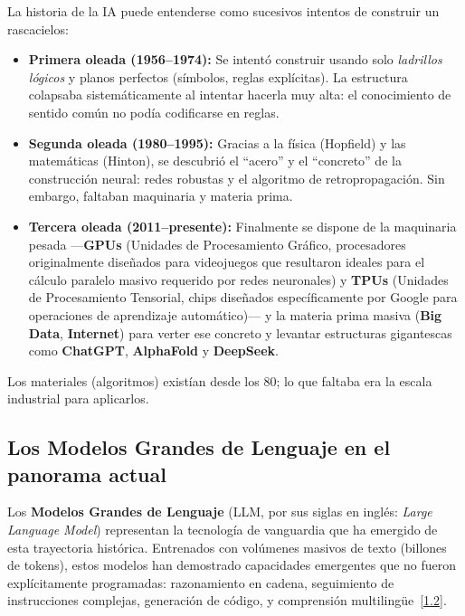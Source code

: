 \documentclass[12pt,a4paper]{report}
\numberwithin{figure}{section}
\begin{document}
\begin{tcolorbox}[colback=blue!5!white, colframe=blue!75!black, title=\textbf{Analogía del Rascacielos}]
La historia de la IA puede entenderse como sucesivos intentos de construir un rascacielos:

\begin{itemize}
    \item \textbf{Primera oleada (1956--1974):} Se intentó construir usando solo \textit{ladrillos lógicos} y planos perfectos (símbolos, reglas explícitas). La estructura colapsaba sistemáticamente al intentar hacerla muy alta: el conocimiento de sentido común no podía codificarse en reglas.
    
    \item \textbf{Segunda oleada (1980--1995):} Gracias a la física (Hopfield) y las matemáticas (Hinton), se descubrió el ``acero'' y el ``concreto'' de la construcción neural: redes robustas y el algoritmo de retropropagación. Sin embargo, faltaban maquinaria y materia prima.
    
    \item \textbf{Tercera oleada (2011--presente):} Finalmente se dispone de la maquinaria pesada ---\textbf{GPUs} (Unidades de Procesamiento Gráfico, procesadores originalmente diseñados para videojuegos que resultaron ideales para el cálculo paralelo masivo requerido por redes neuronales) y \textbf{TPUs} (Unidades de Procesamiento Tensorial, chips diseñados específicamente por Google para operaciones de aprendizaje automático)--- y la materia prima masiva (\textbf{Big Data}, \textbf{Internet}) para verter ese concreto y levantar estructuras gigantescas como \textbf{ChatGPT}, \textbf{AlphaFold} y \textbf{DeepSeek}.
\end{itemize}

Los materiales (algoritmos) existían desde los 80; lo que faltaba era la escala industrial para aplicarlos.
\end{tcolorbox}

\subsection[Los LLM en el panorama actual]{Los Modelos Grandes de Lenguaje en el panorama actual}
\label{subsec:llm_panorama}

Los \textbf{Modelos Grandes de Lenguaje} (LLM, por sus siglas en inglés: \textit{Large Language Model}) representan la tecnología de vanguardia que ha emergido de esta trayectoria histórica. Entrenados con volúmenes masivos de texto (billones de tokens), estos modelos han demostrado capacidades emergentes que no fueron explícitamente programadas: razonamiento en cadena, seguimiento de instrucciones complejas, generación de código, y comprensión multilingüe~\hyperref[ref:1]{[1.2]}.
\end{document}
